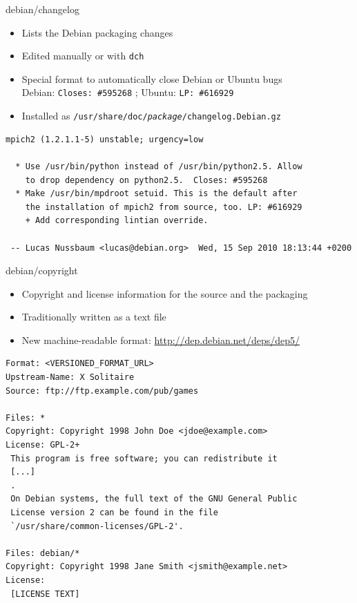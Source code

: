 \documentclass[10pt,final]{beamer}
\begin{document}
\begin{frame}[fragile]{debian/changelog}
  \begin{itemize}
  \item Lists the Debian packaging changes
  \item Edited manually or with \texttt{dch}
  \item Special format to automatically close Debian or Ubuntu bugs\\
    Debian: \texttt{Closes:~\#595268} ; Ubuntu: \texttt{LP:~\#616929}
  \item Installed as \texttt{/usr/share/doc/\textit{package}/changelog.Debian.gz}
  \end{itemize}
  \begin{lstlisting}[basicstyle=\ttfamily\footnotesize]
mpich2 (1.2.1.1-5) unstable; urgency=low

  * Use /usr/bin/python instead of /usr/bin/python2.5. Allow
    to drop dependency on python2.5.  Closes: #595268
  * Make /usr/bin/mpdroot setuid. This is the default after
    the installation of mpich2 from source, too. LP: #616929
    + Add corresponding lintian override.

 -- Lucas Nussbaum <lucas@debian.org>  Wed, 15 Sep 2010 18:13:44 +0200
\end{lstlisting}
\end{frame}

\begin{frame}[fragile]{debian/copyright}
  \hbr
  \begin{itemize}
  \item Copyright and license information for the source and the packaging
  \item Traditionally written as a text file
  \item New machine-readable format: \url{http://dep.debian.net/deps/dep5/}
  \end{itemize}
  \begin{lstlisting}[basicstyle=\ttfamily\footnotesize]
Format: <VERSIONED_FORMAT_URL>
Upstream-Name: X Solitaire
Source: ftp://ftp.example.com/pub/games

Files: *
Copyright: Copyright 1998 John Doe <jdoe@example.com>
License: GPL-2+
 This program is free software; you can redistribute it
 [...]
 .
 On Debian systems, the full text of the GNU General Public
 License version 2 can be found in the file
 `/usr/share/common-licenses/GPL-2'.

Files: debian/*
Copyright: Copyright 1998 Jane Smith <jsmith@example.net>
License:
 [LICENSE TEXT]
\end{lstlisting}
\end{frame}
\end{document}

